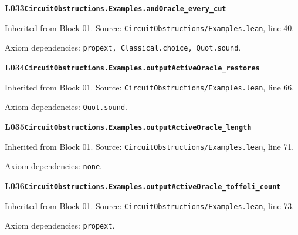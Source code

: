 \begin{minipage}{\linewidth}
\hypertarget{L033}{}
{\small\sffamily\bfseries\color{ink}L033\quad\nolinkurl{CircuitObstructions.Examples.andOracle_every_cut}}\par
{\scriptsize\sffamily\color{muted}Inherited from Block 01. Source: \nolinkurl{CircuitObstructions/Examples.lean}, line 40.}\par
{}
{\scriptsize\sffamily\color{muted}Axiom dependencies: \nolinkurl{propext, Classical.choice, Quot.sound}.}
\end{minipage}\par\medskip
\begin{minipage}{\linewidth}
\hypertarget{L034}{}
{\small\sffamily\bfseries\color{ink}L034\quad\nolinkurl{CircuitObstructions.Examples.outputActiveOracle_restores}}\par
{\scriptsize\sffamily\color{muted}Inherited from Block 01. Source: \nolinkurl{CircuitObstructions/Examples.lean}, line 66.}\par
{}
{\scriptsize\sffamily\color{muted}Axiom dependencies: \nolinkurl{Quot.sound}.}
\end{minipage}\par\medskip
\begin{minipage}{\linewidth}
\hypertarget{L035}{}
{\small\sffamily\bfseries\color{ink}L035\quad\nolinkurl{CircuitObstructions.Examples.outputActiveOracle_length}}\par
{\scriptsize\sffamily\color{muted}Inherited from Block 01. Source: \nolinkurl{CircuitObstructions/Examples.lean}, line 71.}\par
{}
{\scriptsize\sffamily\color{muted}Axiom dependencies: \nolinkurl{none}.}
\end{minipage}\par\medskip
\begin{minipage}{\linewidth}
\hypertarget{L036}{}
{\small\sffamily\bfseries\color{ink}L036\quad\nolinkurl{CircuitObstructions.Examples.outputActiveOracle_toffoli_count}}\par
{\scriptsize\sffamily\color{muted}Inherited from Block 01. Source: \nolinkurl{CircuitObstructions/Examples.lean}, line 73.}\par
{}
{\scriptsize\sffamily\color{muted}Axiom dependencies: \nolinkurl{propext}.}
\end{minipage}\par\medskip

